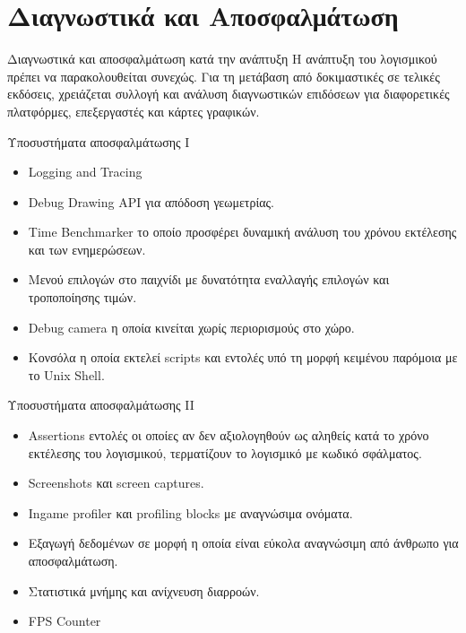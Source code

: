 \documentclass{beamer}
\begin{document}
	
	\section{Διαγνωστικά και Αποσφαλμάτωση}
	\begin{frame}{Διαγνωστικά και αποσφαλμάτωση κατά την ανάπτυξη}
		Η ανάπτυξη του λογισμικού πρέπει να παρακολουθείται συνεχώς. 
		\newline 
		\newline 
		Για τη μετάβαση από δοκιμαστικές σε τελικές εκδόσεις, χρειάζεται συλλογή και ανάλυση διαγνωστικών επιδόσεων για διαφορετικές πλατφόρμες, επεξεργαστές και κάρτες γραφικών. 
	\end{frame}
	
	\begin{frame}{Υποσυστήματα αποσφαλμάτωσης Ι}
		\begin{itemize}
			\item Logging and Tracing
			\item Debug Drawing API για απόδοση γεωμετρίας.
			\item Time Benchmarker το οποίο προσφέρει δυναμική ανάλυση του χρόνου εκτέλεσης και των ενημερώσεων.
			\item Μενού επιλογών στο παιχνίδι με δυνατότητα εναλλαγής επιλογών και τροποποίησης τιμών.
			\item Debug camera η οποία κινείται χωρίς περιορισμούς στο χώρο.
			\item Κονσόλα η οποία εκτελεί scripts και εντολές υπό τη μορφή κειμένου παρόμοια με το Unix Shell.	
		\end{itemize}
	\end{frame}			
	
	\begin{frame}{Υποσυστήματα αποσφαλμάτωσης II}
		\begin{itemize}	
			\item Assertions εντολές οι οποίες αν δεν αξιολογηθούν ως αληθείς κατά το χρόνο εκτέλεσης του λογισμικού, τερματίζουν το λογισμικό με κωδικό σφάλματος.				
			\item Screenshots και screen captures.
			\item Ιngame profiler και profiling blocks με αναγνώσιμα ονόματα.
			\item Εξαγωγή δεδομένων σε μορφή η οποία είναι εύκολα αναγνώσιμη από άνθρωπο για αποσφαλμάτωση.
			\item Στατιστικά μνήμης και ανίχνευση διαρροών.
			\item FPS Counter
		\end{itemize}
	\end{frame}
	
\end{document}

